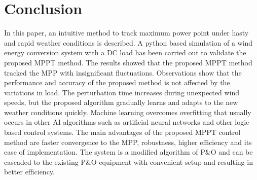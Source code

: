 \section{Conclusion}
 In this paper, an intuitive method to track maximum power point under hasty and rapid weather conditions is described. A python based simulation of a wind energy conversion system with a DC load has been carried out to validate the proposed MPPT method. The results showed that the proposed MPPT method tracked the MPP with insignificant fluctuations. Observations show that the performance and accuracy of the proposed method is not affected by the variations in load. The perturbation time increases during unexpected wind speeds, but the proposed algorithm gradually learns and adapts to the new weather conditions quickly. Machine learning overcomes overfitting that usually occurs in other AI algorithms such as artificial neural networks and other logic based control systems. The main advantages of the proposed MPPT control method are faster convergence to the MPP, robustness, higher efficiency and its ease of implementation. The system is a modified algorithm of P\&O and can be cascaded to the existing P\&O equipment with convenient setup and resulting in better efficiency.
